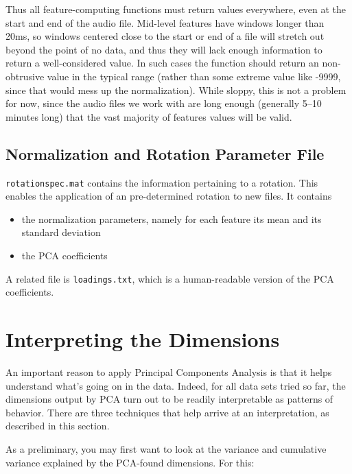 \documentclass[11pt]{article}
\begin{document}
Thus all feature-computing functions must return values everywhere,
even at the start and end of the audio file.  Mid-level features have
windows longer than 20ms, so windows centered close to the start or
end of a file will stretch out beyond the point of no data, and thus
they will lack enough information to return a well-considered value.
In such cases the function should return an non-obtrusive value in
the typical range (rather than some extreme value like -9999, since
that would mess up the normalization).  While sloppy, this is not a
problem for now, since the audio files we work with are long enough
(generally 5--10 minutes long) that the vast majority of features values
will be valid.


\subsection{Normalization and Rotation Parameter File}

{\tt rotationspec.mat}  contains the information pertaining to a
rotation.  This enables the application of an pre-determined rotation 
to new files.  It contains 

\begin{itemize}  \setlength{\itemsep}{0pt}\setlength{\parskip}{0pt}
\item the normalization parameters, namely for each feature its mean
  and its standard deviation

\item the PCA coefficients
\end{itemize}

A related file is {\tt loadings.txt}, which is a human-readable
version of the PCA coefficients.


\section{Interpreting the Dimensions}

An important reason to apply Principal Components Analysis is that it
helps understand what's going on in the data.  Indeed, for all data
sets tried so far, the dimensions output by PCA turn out to be readily
interpretable as patterns of behavior.  There are three techniques
that help arrive at an interpretation, as described in this section.

As a preliminary, you may first want to look at the variance and
cumulative variance explained by the PCA-found dimensions.  For this:
\end{document}
